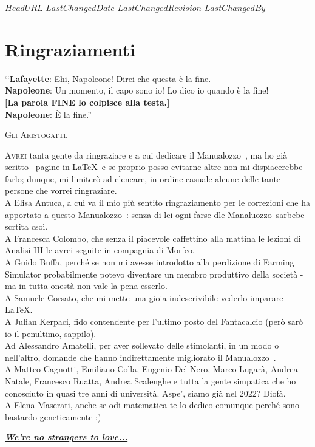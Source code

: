 \svnidlong
{$HeadURL$}
{$LastChangedDate$}
{$LastChangedRevision$}
{$LastChangedBy$}

\chapter{Ringraziamenti}

\begin{introduction}
‘‘\textbf{Lafayette}: Ehi, Napoleone! Direi che questa è la fine.\\
\textbf{Napoleone}: Un momento, il capo sono io! Lo dico io quando è la fine!\\
\textbf{[La parola \textsf{FINE} lo colpisce alla testa.]}\\
\textbf{Napoleone}: È la fine.''
\begin{flushright}
	\textsc{Gli Aristogatti.}
\end{flushright}
\end{introduction}

\lettrine[findent=1pt, nindent=0pt]{A}{vrei} tanta gente da ringraziare e a cui dedicare il Manualozzo\texttrademark\ , ma ho già scritto \thelastpage\  pagine in \LaTeX\ e se proprio posso evitarne altre non mi dispiacerebbe farlo; dunque, mi limiterò ad elencare, in ordine casuale alcune delle tante persone che vorrei ringraziare.\\
A Elisa Antuca, a cui va il mio più sentito ringraziamento per le correzioni che ha apportato a questo Manualozzo\texttrademark\ : senza di lei ogni farse dle Manaluozzo\texttrademark\  sarbebe scrtita csoì.\\
A Francesca Colombo, che senza il piacevole caffettino alla mattina le lezioni di Analisi III le avrei seguite in compagnia di Morfeo.\\
A Guido Buffa, perché se non mi avesse introdotto alla perdizione di Farming Simulator probabilmente potevo diventare un membro produttivo della società - ma in tutta onestà non vale la pena esserlo.\\
A Samuele Corsato, che mi mette una gioia indescrivibile vederlo imparare \LaTeX.\\
A Julian Kerpaci, fido contendente per l'ultimo posto del Fantacalcio (però sarò io il penultimo, sappilo).\\
Ad Alessandro Amatelli, per aver sollevato delle stimolanti, in un modo o nell'altro, domande che hanno indirettamente migliorato il Manualozzo\texttrademark\ .\\
A Matteo Cagnotti, Emiliano Colla, Eugenio Del Nero, Marco Lugarà, Andrea Natale, Francesco Ruatta, Andrea Scalenghe e tutta la gente simpatica che ho conosciuto in quasi tre anni di università. {\small Aspe', siamo già nel 2022?} {\tiny Diofà.}\\
A Elena Maserati, anche se odi matematica te lo dedico comunque perché sono bastardo geneticamente :)
\vfill
\begin{flushright}
	\textcolor{redill}{\href{https://cutt.ly/manualozzotrueending}{\textbf{\textit{We're no strangers to love...}}}}
\end{flushright}